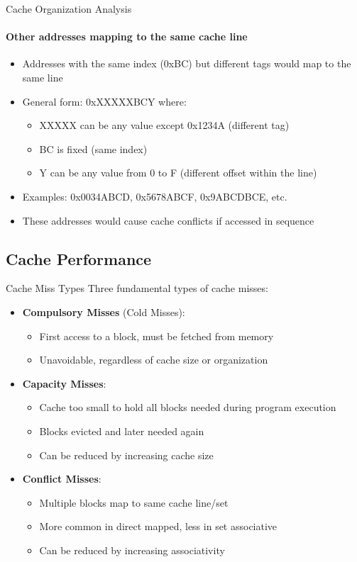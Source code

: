 \begin{example2}{Cache Organization Analysis}
\paragraph{Other addresses mapping to the same cache line}
   \begin{itemize}
     \item Addresses with the same index (0xBC) but different tags would map to the same line
     \item General form: 0xXXXXXBCY where:
     \begin{itemize}
       \item XXXXX can be any value except 0x1234A (different tag)
       \item BC is fixed (same index)
       \item Y can be any value from 0 to F (different offset within the line)
     \end{itemize}
     \item Examples: 0x0034ABCD, 0x5678ABCF, 0x9ABCDBCE, etc.
     \item These addresses would cause cache conflicts if accessed in sequence
   \end{itemize}
\end{example2}

\raggedcolumns
\columnbreak

\subsection{Cache Performance}

\begin{definition}{Cache Miss Types}
Three fundamental types of cache misses:
\begin{itemize}
    \item \textbf{Compulsory Misses} (Cold Misses):
    \begin{itemize}
        \item First access to a block, must be fetched from memory
        \item Unavoidable, regardless of cache size or organization
    \end{itemize}
    \item \textbf{Capacity Misses}:
    \begin{itemize}
        \item Cache too small to hold all blocks needed during program execution
        \item Blocks evicted and later needed again
        \item Can be reduced by increasing cache size
    \end{itemize}
    \item \textbf{Conflict Misses}:
    \begin{itemize}
        \item Multiple blocks map to same cache line/set
        \item More common in direct mapped, less in set associative
        \item Can be reduced by increasing associativity
    \end{itemize}
\end{itemize}
\end{definition}

